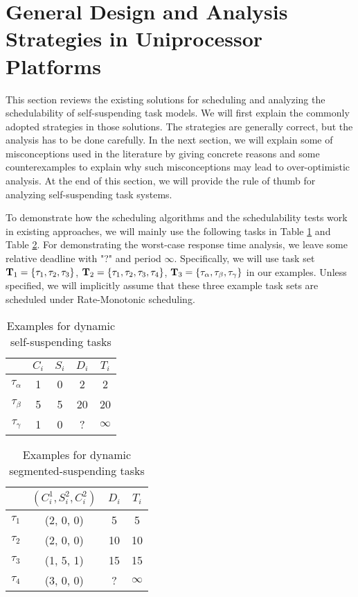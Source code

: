 \section{General Design and Analysis Strategies in Uniprocessor Platforms}
\label{sec:review}

This section reviews the existing solutions for scheduling and analyzing the schedulability of self-suspending task models. We will first explain the commonly adopted strategies in those solutions. The  strategies are generally correct, but the analysis has to be done carefully.  In the next section, we will explain some of misconceptions used in the literature by giving concrete reasons and some counterexamples to explain why such misconceptions may lead to over-optimistic analysis. At the end of this section, we will provide the rule of thumb for analyzing self-suspending task systems. 

To demonstrate how the scheduling algorithms and the schedulability tests work in existing approaches, we will mainly use the following tasks in Table \ref{table:dynamic-example} and Table \ref{table:static-example}. For demonstrating the worst-case response time analysis, we leave some relative deadline with "?" and period $\infty$. Specifically, we will use task set ${\bf T}_1 = \left\{{\tau_1, \tau_2, \tau_3}\right\}$, ${\bf T}_2 = \left\{{\tau_1, \tau_2, \tau_3, \tau_4}\right\}$, ${\bf T}_3 = \left\{{\tau_\alpha, \tau_\beta, \tau_\gamma}\right\}$ in our examples. Unless specified, we will implicitly assume that these three example task sets are scheduled under Rate-Monotonic scheduling. 

\begin{table} 
\centering
    \begin{tabular}{|c|c|c|c|c|}
 \hline
        & $C_i$ &  $S_i$&  $D_i$ & $T_i$\\ 
        \hline
        $\tau_\alpha$ & 1 & 0 &  2 & 2\\ 
        $\tau_\beta$ &  5&  5& 20 & 20 \\ 
        $\tau_\gamma$ & 1 & 0  & ? & $\infty$ \\ 
        \hline
    \end{tabular} 
    \caption{Examples for dynamic self-suspending tasks}
    \label{table:dynamic-example}
\end{table}

\begin{table} 
\centering
    \begin{tabular}{|c|c|c|c|}
 \hline
        & $(C_i^1, S_i^2, C_i^2)$ &  $D_i$ & $T_i$\\ 
        \hline
        $\tau_1$ & (2, 0, 0) &  5 & 5\\ 
        $\tau_2$ &  (2, 0, 0) & 10 & 10 \\ 
        $\tau_3$ & (1, 5, 1) & 15  & 15\\
        $\tau_4$ & (3, 0, 0) & ? & $\infty$\\
        \hline
    \end{tabular} 
    \caption{Examples for dynamic segmented-suspending tasks}
    \label{table:static-example}
\end{table}

